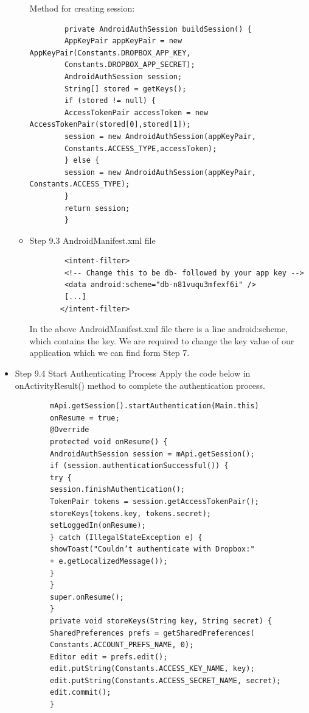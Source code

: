 \documentclass[12pt]{report}
\begin{document}
\begin{itemize}
\begin{itemize}
\begin{lstlisting}
\end{lstlisting}
Method for creating session:
\begin{lstlisting}
        private AndroidAuthSession buildSession() {
        AppKeyPair appKeyPair = new AppKeyPair(Constants.DROPBOX_APP_KEY,
        Constants.DROPBOX_APP_SECRET);
        AndroidAuthSession session;
        String[] stored = getKeys();
        if (stored != null) {
        AccessTokenPair accessToken = new AccessTokenPair(stored[0],stored[1]);
        session = new AndroidAuthSession(appKeyPair,
        Constants.ACCESS_TYPE,accessToken);
        } else {
        session = new AndroidAuthSession(appKeyPair, Constants.ACCESS_TYPE);
        }
        return session;
        }
\end{lstlisting}
\item Step 9.3 AndroidManifest.xml file
\begin{lstlisting}
        <intent-filter>
        <!-- Change this to be db- followed by your app key -->
        <data android:scheme="db-n81vuqu3mfexf6i" />
        [...]
       </intent-filter>
\end{lstlisting}
In the above AndroidManifest.xml file there is a line  android:scheme, which contains
the key. We are required to change the key value of our application which we can find form
Step 7.

\end{itemize}
\item Step 9.4 Start Authenticating Process
Apply the code below in onActivityResult() method to complete the authentication
process.
\begin{lstlisting}
        mApi.getSession().startAuthentication(Main.this)
        onResume = true;
        @Override
        protected void onResume() {
        AndroidAuthSession session = mApi.getSession();
        if (session.authenticationSuccessful()) {
        try {
        session.finishAuthentication();
        TokenPair tokens = session.getAccessTokenPair();
        storeKeys(tokens.key, tokens.secret);
        setLoggedIn(onResume);
        } catch (IllegalStateException e) {
        showToast("Couldn’t authenticate with Dropbox:"
        + e.getLocalizedMessage());
        }
        }
        super.onResume();
        }
        private void storeKeys(String key, String secret) {
        SharedPreferences prefs = getSharedPreferences(
        Constants.ACCOUNT_PREFS_NAME, 0);
        Editor edit = prefs.edit();
        edit.putString(Constants.ACCESS_KEY_NAME, key);
        edit.putString(Constants.ACCESS_SECRET_NAME, secret);
        edit.commit();
        }
\end{lstlisting}

\end{itemize}




%


\nocite{gehani2012spade}
\nocite{elenkov2014android}
\nocite{Mateti}
\nocite{linuxkernelarchives}
\nocite{connectivitymanager}
\nocite{linuxprocesses}
\nocite{SystemCalls}
\nocite{dropboxcloud}
\nocite{wifimanager}
\end{document}
